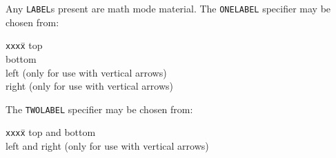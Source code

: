 Any \verb"LABEL"s present are math mode material.  The 
\verb"ONELABEL" specifier may be chosen from:
\begin{tabbing}
   {\tt xxx}\={\tt x}\qquad\=\kill
   \> top\\
   \>  bottom\\
   \>  left (only for use with vertical arrows)\\
   \>  right (only for use with vertical arrows)
\end{tabbing}
The \verb"TWOLABEL" specifier may be chosen from:
\begin{tabbing}
   {\tt xxx}\={\tt x}\qquad\=\kill
   \>  top and bottom\\
   \>  left and right (only for use with vertical arrows)
\end{tabbing}

